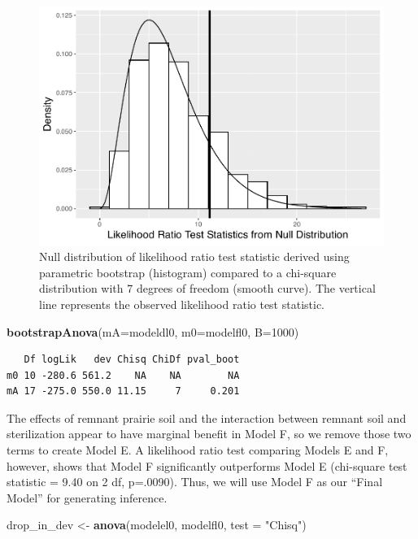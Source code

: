\documentclass[
]{krantz}
\newenvironment{Shaded}{\begin{snugshade}}{\end{snugshade}}
\newcommand{\AttributeTok}[1]{\textcolor[rgb]{0.27,0.27,0.27}{#1}}
\newcommand{\DecValTok}[1]{\textcolor[rgb]{0.06,0.06,0.06}{#1}}
\newcommand{\FunctionTok}[1]{\textcolor[rgb]{0.27,0.27,0.27}{\textbf{#1}}}
\newcommand{\NormalTok}[1]{#1}
\newcommand{\OtherTok}[1]{\textcolor[rgb]{0.37,0.37,0.37}{#1}}
\newcommand{\StringTok}[1]{\textcolor[rgb]{0.5,0.5,0.5}{#1}}
\begin{document}
\begin{figure}

{\centering \includegraphics[width=0.6\linewidth]{bookdown-BeyondMLR_files/figure-latex/parabootDF-1} 

}

\caption{Null distribution of likelihood ratio test statistic derived using parametric bootstrap (histogram) compared to a chi-square distribution with 7 degrees of freedom (smooth curve).  The vertical line represents the observed likelihood ratio test statistic.}\label{fig:parabootDF}
\end{figure}

\begin{Shaded}
\begin{Highlighting}[]
\FunctionTok{bootstrapAnova}\NormalTok{(}\AttributeTok{mA=}\NormalTok{modeldl0, }\AttributeTok{m0=}\NormalTok{modelfl0, }\AttributeTok{B=}\DecValTok{1000}\NormalTok{)}
\end{Highlighting}
\end{Shaded}

\begin{verbatim}
   Df logLik   dev Chisq ChiDf pval_boot
m0 10 -280.6 561.2    NA    NA        NA
mA 17 -275.0 550.0 11.15     7     0.201
\end{verbatim}

The effects of remnant prairie soil and the interaction between remnant soil and sterilization appear to have marginal benefit in Model F, so we remove those two terms to create Model E. A likelihood ratio test comparing Models E and F, however, shows that Model F significantly outperforms Model E (chi-square test statistic = 9.40 on 2 df, p=.0090). Thus, we will use Model F as our ``Final Model'' for generating inference.

\begin{Shaded}
\begin{Highlighting}[]
\NormalTok{drop\_in\_dev }\OtherTok{\textless{}{-}} \FunctionTok{anova}\NormalTok{(modelel0, modelfl0, }\AttributeTok{test =} \StringTok{"Chisq"}\NormalTok{)}
\end{Highlighting}
\end{Shaded}
\end{document}
